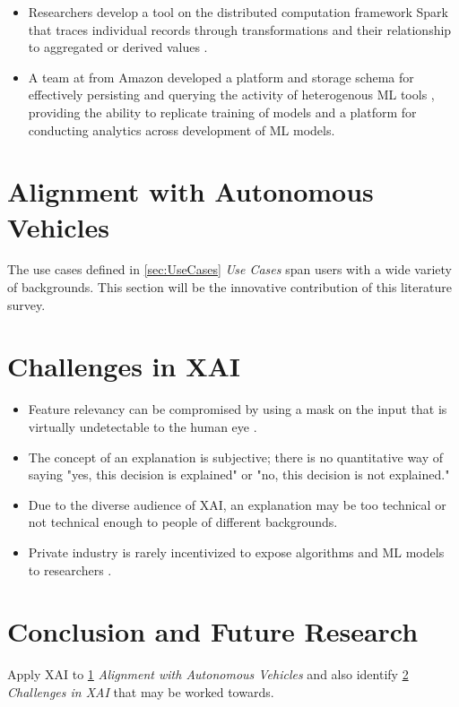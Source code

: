 \documentclass{IEEEtran}
\begin{document}
\begin{itemize}
    \item Researchers develop a tool on the distributed computation framework Spark that traces individual records through transformations and their relationship to aggregated or derived values  \cite{Interlandi2017}.
    \item A team at from Amazon developed a platform and storage schema for effectively persisting and querying the activity of heterogenous ML tools \cite{Schelter2017}, providing the ability to replicate training of models and a platform for conducting analytics across development of ML models.
\end{itemize}

\section{Alignment with Autonomous Vehicles}\label{sec:Alignment}

The use cases defined in \ref{sec:UseCases} \textit{Use Cases} span users with a wide variety of backgrounds.  This section will be the innovative contribution of this literature survey.

\section{Challenges in XAI} \label{sec:Challenges}

\begin{itemize}
    \item Feature relevancy can be compromised by using a mask on the input that is virtually undetectable to the human eye \cite{DBLP:journals/corr/abs-1812-00891}.

    \item The concept of an explanation is subjective; there is no quantitative way of saying "yes, this decision is explained" or "no, this decision is not explained." \cite{Bibal2016}

    \item Due to the diverse audience of XAI, an explanation may be too technical or not technical enough to people of different backgrounds.
    
    \item Private industry is rarely incentivized to expose algorithms and ML models to researchers \cite{Veale:2018:FAD:3173574.3174014}.
\end{itemize}

\section{Conclusion and Future Research}

Apply XAI to \ref{sec:Alignment} \textit{Alignment with Autonomous Vehicles} and also identify \ref{sec:Challenges} \textit{Challenges in XAI} that may be worked towards.


 
\end{document}
